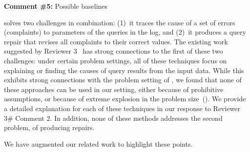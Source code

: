 


\comskip

\noindent
\textbf{Comment \#5:} Possible baselines
\begin{quote}
\end{quote}

\sys solves two challenges in combination: (1)~it traces the cause of a set of
errors (complaints) to parameters of the queries in the log, and (2)~it
produces a query repair that revises all complaints to their correct values. The
existing work suggested by Reviewer 3~\cite{Wu13, roy2014formal,
chalamalla2014,meliou2011tracing} has strong connections to the first of these
two challenges: under certain problem settings, all of these techniques focus on
explaining or finding the causes of query results from the input data. While
this exhibits strong connections with the problem setting of \sys, we found
that none of these approaches can be used in our setting, either because of
prohibitive assumptions, or because of extreme explosion in the problem
size~(\cite{meliou2011tracing}). We provide a detailed explanation for each of
these techniques in our response to Reviewer 3\# Comment 2. In addition, none
of these methods addresses the second problem, of producing repairs.

We have augmented our related work to highlight these points.


